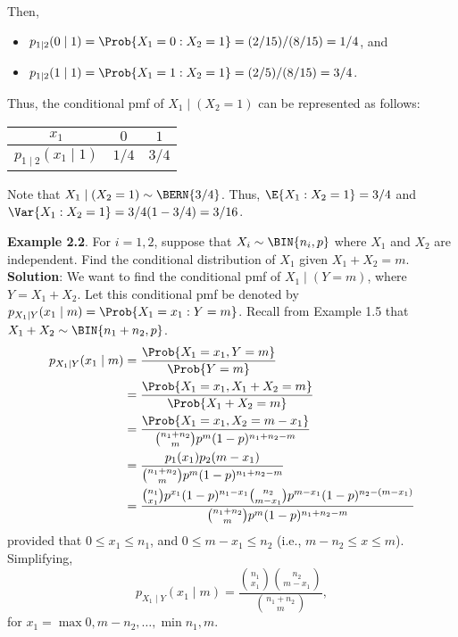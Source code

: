 \begin{Example}
\begin{center}
\begin{NiceTabular}{cc|ccc|c}
        \end{NiceTabular}
    \end{center}
    Then,
    \begin{itemize}
        \item $ p_{1\mid 2}(0\mid 1)=\Prob{X_1=0\given X_2=1}=(2/15)/(8/15)=1/4 $, and
        \item $ p_{1\mid 2}(1\mid 1)=\Prob{X_1=1\given X_2=1}=(2/5)/(8/15)=3/4 $.
    \end{itemize}
    Thus, the conditional pmf of $ X_1\mid(X_2=1) $ can be
    represented as follows:
    \begin{center}
        \begin{NiceTabular}{c|cc}
            $ x_1 $ & $ 0 $ & $ 1 $\\
            \midrule
            $ p_{1\mid 2}(x_1\mid 1) $ & $ 1/4 $ & $ 3/4 $
        \end{NiceTabular}
    \end{center}
    Note that $ X_1\mid (X_2=1)\sim \BERN{3/4} $. Thus, $ \E{X_1\given X_2=1}=3/4 $ and $ \Var{X_1\given X_2=1}=3/4(1-3/4)=3/16 $.
\end{Example}
\begin{Example}
    \textbf{Example 2.2}. For $ i=1,2 $, suppose that $ X_i \sim \BIN{n_i,p} $ where $ X_1 $ and $ X_2 $ are independent. Find the
    conditional distribution of $ X_1 $ given $ X_1+X_2=m $.
    \tcblower{}
    \textbf{Solution}: We want to find the conditional pmf of $ X_1\mid (Y=m) $, where $ Y=X_1+X_2 $. Let this conditional
    pmf be denoted by $ p_{X_1\mid Y}(x_1\mid m)=\Prob{X_1=x_1\given Y=m} $.
    Recall from Example 1.5 that $ X_1+X_2 \sim \BIN{n_1+n_2,p} $.
    \begin{align*}
        p_{X_1\mid Y}(x_1\mid m)
         & =\frac{\Prob{X_1=x_1,Y=m}}{\Prob{Y=m}}                                                                                               \\
         & =\frac{\Prob{X_1=x_1,X_1+X_2=m}}{\Prob{X_1+X_2=m}}                                                                                   \\
         & =\frac{\Prob{X_1=x_1,X_2=m-x_1}}{\binom{n_1+n_2}{m}p^m (1-p)^{n_1+n_2-m}}                                                            \\
         & =\frac{p_1(x_1)p_2(m-x_1)}{\binom{n_1+n_2}{m}p^m (1-p)^{n_1+n_2-m}}                                                                  \\
         & =\frac{\binom{n_1}{x_1}p^{x_1}(1-p)^{n_1-x_1}\binom{n_2}{m-x_1}p^{m-x_1}(1-p)^{n_2-(m-x_1)}}{\binom{n_1+n_2}{m}p^m(1-p)^{n_1+n_2-m}}
    \end{align*}
    provided that $ 0\le x_1\le n_1 $, and $ 0\le m-x_1\le n_2 $ (i.e., $ m-n_2\le x\le m $). Simplifying,
    \[p_{X_1\mid Y}(x_1\mid m)=\frac{\binom{n_1}{x_1}\binom{n_2}{m-x_1}}{\binom{n_1+n_2}{m}},\]
    for $ x_1=\max{0,m-n_2},\ldots,\min{n_1,m} $.
\end{Example}
